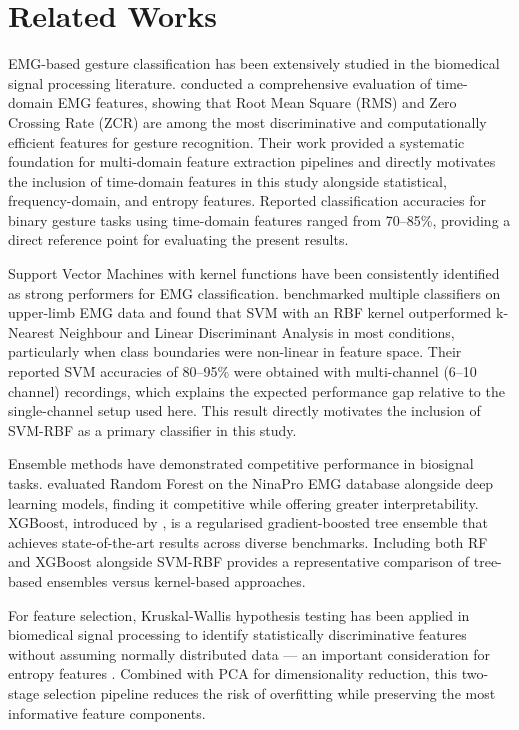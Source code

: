 \section{Related Works}

EMG-based gesture classification has been extensively studied in the biomedical signal processing
literature. \citet{Phinyomark2012} conducted a comprehensive evaluation of time-domain EMG
features, showing that Root Mean Square (RMS) and Zero Crossing Rate (ZCR) are among the most
discriminative and computationally efficient features for gesture recognition. Their work provided
a systematic foundation for multi-domain feature extraction pipelines and directly motivates the
inclusion of time-domain features in this study alongside statistical, frequency-domain, and
entropy features. Reported classification accuracies for binary gesture tasks using time-domain
features ranged from 70--85\%, providing a direct reference point for evaluating the present
results.

Support Vector Machines with kernel functions have been consistently identified as strong
performers for EMG classification. \citet{Oskoei2007} benchmarked multiple classifiers on
upper-limb EMG data and found that SVM with an RBF kernel outperformed k-Nearest Neighbour and
Linear Discriminant Analysis in most conditions, particularly when class boundaries were
non-linear in feature space. Their reported SVM accuracies of 80--95\% were obtained with
multi-channel (6--10 channel) recordings, which explains the expected performance gap relative
to the single-channel setup used here. This result directly motivates the inclusion of SVM-RBF
as a primary classifier in this study.

Ensemble methods have demonstrated competitive performance in biosignal tasks. \citet{Atzori2016}
evaluated Random Forest on the NinaPro EMG database alongside deep learning models, finding it
competitive while offering greater interpretability. XGBoost, introduced by \citet{Chen2016}, is
a regularised gradient-boosted tree ensemble that achieves state-of-the-art results across
diverse benchmarks. Including both RF and XGBoost alongside SVM-RBF provides a representative
comparison of tree-based ensembles versus kernel-based approaches.

For feature selection, Kruskal-Wallis hypothesis testing has been applied in biomedical signal
processing to identify statistically discriminative features without assuming normally distributed
data --- an important consideration for entropy features \citep{Subasi2013}. Combined with PCA
for dimensionality reduction, this two-stage selection pipeline reduces the risk of overfitting
while preserving the most informative feature components.
